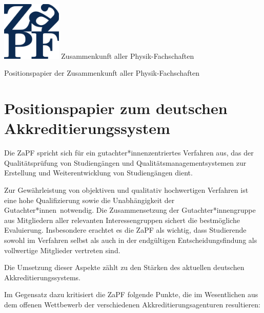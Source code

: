 \documentclass[DIV=calc]{scrartcl}
\newcommand{\gen}{*innen}
\begin{document}
    \hspace{0.87\textwidth}
    \begin{minipage}{120pt}
        \vspace{-1.8cm}
        \includegraphics[width=80pt]{logo.pdf}
        \centering
        \small Zusammenkunft aller Physik-Fachschaften
    \end{minipage}
    \begin{center}
        \huge{Positionspapier der Zusammenkunft aller Physik-Fachschaften} \\
        \normalsize
    \end{center}
    
    \vspace{1cm}
    \section*{Positionspapier zum deutschen Akkreditierungssystem}
    
    Die ZaPF spricht sich f\"ur ein gutachter{\gen}zentriertes Verfahren aus, das
    der Qualit\"atspr\"ufung von Studieng\"angen und Qualit\"atsmanagementsystemen zur
    Erstellung und Weiterentwicklung von Studieng\"angen dient.
    
    Zur Gew\"ahrleistung von objektiven und qualitativ hochwertigen Verfahren ist
    eine hohe Qualifizierung sowie die Unabh\"angigkeit der Gutachter\gen\
    notwendig. Die Zusammensetzung der Gutachter{\gen}gruppe aus Mitgliedern
    aller relevanten Interessengruppen sichert die bestm\"ogliche Evaluierung.
    Insbesondere erachtet es die ZaPF als wichtig, dass Studierende sowohl im
    Verfahren selbst als auch in der endg\"ultigen Entscheidungsfindung als
    vollwertige Mitglieder vertreten sind.
    
    Die Umsetzung dieser Aspekte z\"ahlt zu den St\"arken des aktuellen deutschen
    Akkreditierungssystems.
    
    Im Gegensatz dazu kritisiert die ZaPF folgende Punkte, die im Wesentlichen
    aus dem offenen Wettbewerb der verschiedenen Akkreditierungsagenturen
    resultieren:
    
\end{document}
